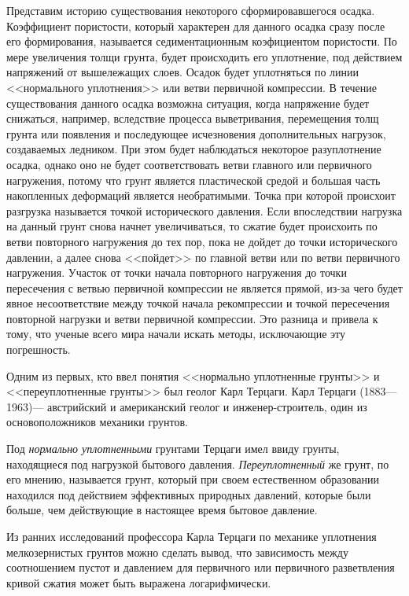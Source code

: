 Представим историю существования некоторого сформировавшегося осадка. 
Коэффициент пористости, который характерен для данного осадка сразу после его формирования, называется седиментационным коэфициентом пористости. 
По мере увеличения толщи грунта, будет происходить его уплотнение, под действием напряжений от вышележащих слоев.
Осадок будет уплотняться по линии <<нормального уплотнения>> или ветви первичной компрессии. 
В течение существования данного осадка возможна ситуация, когда напряжение будет снижаться, например, вследствие процесса выветривания, перемещения толщ грунта или появления и последующее исчезновения дополнительных нагрузок, создаваемых ледником. 
При этом будет наблюдаться некоторое разуплотнение осадка, однако оно не будет соответствовать ветви главного или первичного нагружения, потому что грунт является пластической средой и большая часть накопленных деформаций является необратимыми. 
Точка при которой происхоит разгрузка называется точкой исторического давления. 
Если впоследствии нагрузка на данный грунт снова начнет увеличиваться, то сжатие будет происхоить по ветви повторного нагружения до тех пор, пока не дойдет до точки исторического давлении, а далее снова <<пойдет>> по главной ветви или по ветви первичного нагружения. 
Участок от точки начала повторного нагружения до точки пересечения с ветвью первичной компрессии не является прямой, из-за чего будет явное несоответствие между точкой начала рекомпрессии и точкой пересечения повторной нагрузки и ветви первичной компрессии. 
Это разница и привела к тому, что ученые всего мира начали искать методы, исключающие эту погрешность.

Одним из первых, кто ввел понятия <<нормально уплотненные грунты>> и <<переуплотненные грунты>> был геолог Карл Терцаги.
Карл Терцаги (1883—1963)— австрийский и американский геолог и инженер-строитель, один из основоположников механики грунтов.

 Под \textit{нормально уплотненными} грунтами Терцаги имел ввиду грунты, находящиеся под нагрузкой бытового давления. \textit{Переуплотненный} же грунт, по его мнению, называется грунт, который при своем естественном образовании находился под действием эффективных природных давлений, которые были больше, чем действующие в настоящее время бытовое давление. 

Из ранних исследований профессора Карла Терцаги по механике уплотнения мелкозернистых грунтов можно сделать вывод, что зависимость между соотношением пустот и давлением для первичного или первичного разветвления кривой сжатия может быть выражена логарифмически. 

